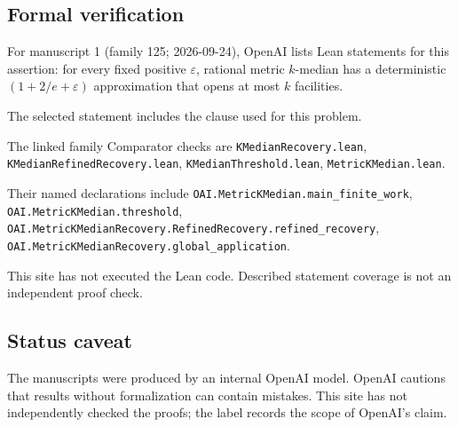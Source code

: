 \documentclass[11pt]{article}
\begin{document}
\subsection{Formal verification}
For manuscript 1 (family 125; 2026-09-24), OpenAI lists Lean statements for this assertion: for every fixed positive $\varepsilon$, rational metric $k$-median has a deterministic $(1+2/e+\varepsilon)$ approximation that opens at most $k$ facilities.

The selected statement includes the clause used for this problem.

The linked family Comparator checks are \texttt{KMedianRecovery.lean}, \texttt{KMedianRefinedRecovery.lean}, \texttt{KMedianThreshold.lean}, \texttt{MetricKMedian.lean}.

Their named declarations include \texttt{OAI.MetricKMedian.main\_finite\_work}, \texttt{OAI.MetricKMedian.threshold}, \texttt{OAI.MetricKMedianRecovery.RefinedRecovery.refined\_recovery}, \texttt{OAI.MetricKMedianRecovery.global\_application}.

This site has not executed the Lean code. Described statement coverage is not an independent proof check.

\subsection{Status caveat}
The manuscripts were produced by an internal OpenAI model. OpenAI cautions that results without formalization can contain mistakes. This site has not independently checked the proofs; the label records the scope of OpenAI's claim.
\end{document}
